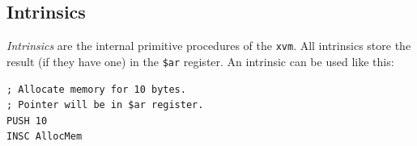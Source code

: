 \documentclass[a5paper]{report}
\def\xvm{\texttt{xvm}\xspace}
\begin{document}
\subsection{Intrinsics}

\textit{Intrinsics} are the internal primitive procedures of the \xvm. All intrinsics store the result
(if they have one) in the \texttt{\$ar} register. An intrinsic can be used like this:
\begin{lstlisting}
; Allocate memory for 10 bytes.
; Pointer will be in $ar register.
PUSH 10
INSC AllocMem
\end{lstlisting}
\end{document}
